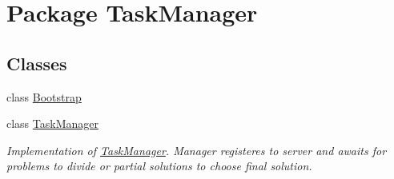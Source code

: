 \hypertarget{namespace_task_manager}{}\section{Package Task\+Manager}
\label{namespace_task_manager}
\subsection*{Classes}
\begin{DoxyCompactItemize}
\item 
class \hyperlink{class_task_manager_1_1_bootstrap}{Bootstrap}
\item 
class \hyperlink{class_task_manager_1_1_task_manager}{Task\+Manager}
\begin{DoxyCompactList}\small\item\em Implementation of \hyperlink{class_task_manager_1_1_task_manager}{Task\+Manager}. Manager registeres to server and awaits for problems to divide or partial solutions to choose final solution. \end{DoxyCompactList}\end{DoxyCompactItemize}
